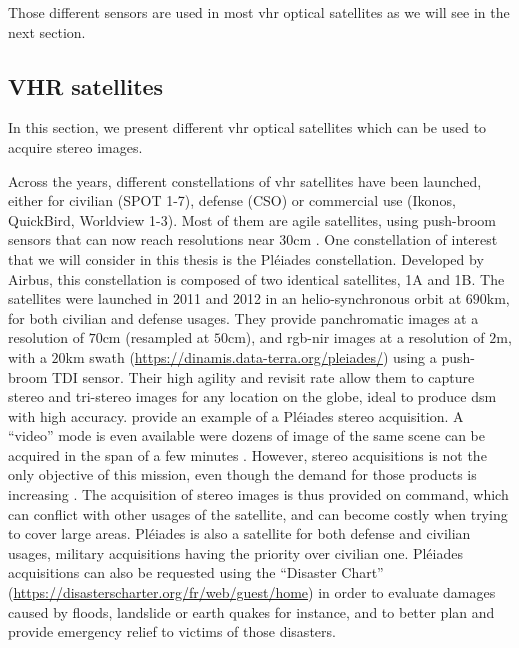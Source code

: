 Those different sensors are used in most \acrfull{vhr} optical satellites as we will see in the next section.

\subsection{VHR satellites}
In this section, we present different \acrshort{vhr} optical satellites which can be used to acquire stereo images. 

Across the years, different constellations of \acrshort{vhr} satellites have been launched, either for civilian (SPOT 1-7), defense (CSO) or commercial use (Ikonos, QuickBird, Worldview 1-3). Most of them are agile satellites, using push-broom sensors that can now reach resolutions near 30cm \cite{cnes_imagerie_2008, coffer_vertical_2022}. One constellation of interest that we will consider in this thesis is the Pléiades constellation. Developed by Airbus, this constellation is composed of two identical satellites, 1A and 1B. The satellites were launched in 2011 and 2012 in an helio-synchronous orbit at $690$km, for both civilian and defense usages. They provide panchromatic images at a resolution of $70$cm (resampled at $50$cm), and \acrshort{rgb}-\acrshort{nir} images at a resolution of $2$m, with a $20$km swath (\url{https://dinamis.data-terra.org/pleiades/}) using a push-broom TDI sensor. Their high agility and revisit rate allow them to capture stereo and tri-stereo images for any location on the globe, ideal to produce \acrshort{dsm} with high accuracy.  provide an example of a Pléiades stereo acquisition. A ``video'' mode is even available were dozens of image of the same scene can be acquired in the span of a few minutes \cite{lebegue_pleiades-hr_2015}. However, stereo acquisitions is not the only objective of this mission, even though the demand for those products is increasing \cite{berthier_glacier_2014, poli_radiometric_2015, rieg_pleiades_2018, loghin_potential_2020}. The acquisition of stereo images is thus provided on command, which can conflict with other usages of the satellite, and can become costly when trying to cover large areas. Pléiades is also a satellite for both defense and civilian usages, military acquisitions having the priority over civilian one. Pléiades acquisitions can also be requested using the ``Disaster Chart'' (\url{https://disasterscharter.org/fr/web/guest/home}) in order to evaluate damages caused by floods, landslide or earth quakes for instance, and to better plan and provide emergency relief to victims of those disasters.

